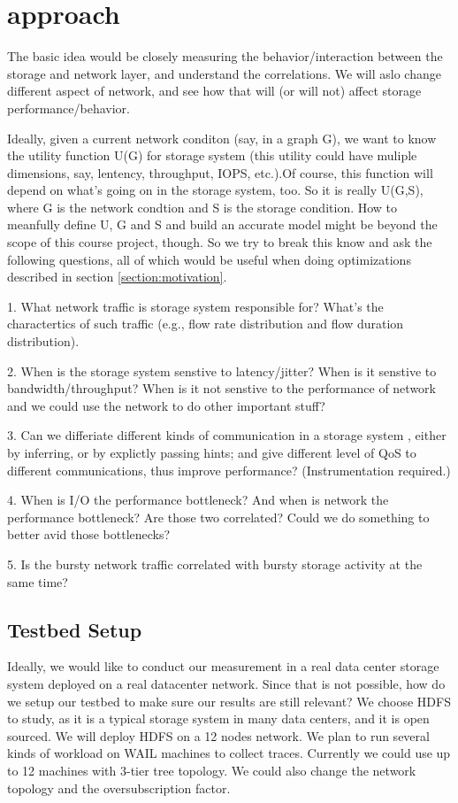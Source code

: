 \section{approach}
\label{sec:approach}
The basic idea would be closely measuring the behavior/interaction between the storage and network layer, and understand the correlations. We will aslo change different aspect of network, and see how that will (or will not) affect storage performance/behavior.

Ideally, given a current network conditon (say, in a graph G), we want to know the utility function U(G) for storage system (this utility could have muliple dimensions, say, lentency, throughput, IOPS, etc.).Of course, this function will depend on what's going on in the storage system, too. So it is really U(G,S), where G is the network condtion and S is the storage  condition. How to meanfully define U, G and S and build an accurate model might be beyond the scope of this course project, though. So we try to break this know and ask the following questions, all of which would be useful when doing optimizations described in section \ref{section:motivation}.

1. What network traffic is storage system responsible for? What's the charactertics of such traffic (e.g., flow rate distribution and flow duration distribution).

2. When is the storage system senstive to latency/jitter? When is it senstive to bandwidth/throughput? When is it not senstive to the performance of network and we could use the network to do other important stuff? 

3. Can we differiate different kinds of communication in a storage system %
, either by inferring, or by explictly passing hints; and give different level of QoS to different communications, thus improve performance? (Instrumentation required.)

4. When is I/O the performance bottleneck? And when is network the performance bottleneck? Are those two correlated? Could we do something to better avid those bottlenecks?

5. Is the bursty network traffic correlated with bursty storage activity at the same time? 


\subsection {\bf Testbed Setup}
Ideally, we would like to conduct our measurement in a real data center storage system deployed on a real datacenter network. Since that is not possible, how do we setup our testbed to make sure our results are still relevant? 
We choose HDFS to study, as it is a typical storage system in many data centers, and it is open sourced. We will deploy HDFS on a 12 nodes network. We plan to run several kinds of workload on WAIL machines to collect traces. Currently we could use up to 12 machines with 3-tier tree topology. We could also change the network topology and the oversubscription factor. 


